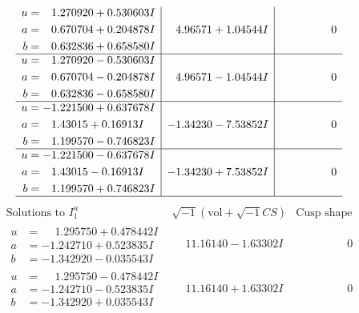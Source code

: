 \documentclass[1p]{elsarticle_modified}
\theoremstyle{definition}
\newcommand{\I}{\sqrt{-1}}
\begin{document}
$$\begin{array}{c|c|c}
\begin{aligned}
u &= \phantom{-}1.270920 + 0.530603 I \\
a &= \phantom{-}0.670704 + 0.204878 I \\
b &= \phantom{-}0.632836 + 0.658580 I\end{aligned}
 & \phantom{-}4.96571 + 1.04544 I & \phantom{-0.000000 } 0 \\ \hline\begin{aligned}
u &= \phantom{-}1.270920 - 0.530603 I \\
a &= \phantom{-}0.670704 - 0.204878 I \\
b &= \phantom{-}0.632836 - 0.658580 I\end{aligned}
 & \phantom{-}4.96571 - 1.04544 I & \phantom{-0.000000 } 0 \\ \hline\begin{aligned}
u &= -1.221500 + 0.637678 I \\
a &= \phantom{-}1.43015 + 0.16913 I \\
b &= \phantom{-}1.199570 - 0.746823 I\end{aligned}
 & -1.34230 - 7.53852 I & \phantom{-0.000000 } 0 \\ \hline\begin{aligned}
u &= -1.221500 - 0.637678 I \\
a &= \phantom{-}1.43015 - 0.16913 I \\
b &= \phantom{-}1.199570 + 0.746823 I\end{aligned}
 & -1.34230 + 7.53852 I & \phantom{-0.000000 } 0\\
 \hline 
 \end{array}$$\newpage$$\begin{array}{c|c|c}  
\text{Solutions to }I^u_{1}& \I (\text{vol} + \sqrt{-1}CS) & \text{Cusp shape}\\
 \hline 
\begin{aligned}
u &= \phantom{-}1.295750 + 0.478442 I \\
a &= -1.242710 + 0.523835 I \\
b &= -1.342920 - 0.035543 I\end{aligned}
 & \phantom{-}11.16140 - 1.63302 I & \phantom{-0.000000 } 0 \\ \hline\begin{aligned}
u &= \phantom{-}1.295750 - 0.478442 I \\
a &= -1.242710 - 0.523835 I \\
b &= -1.342920 + 0.035543 I\end{aligned}
 & \phantom{-}11.16140 + 1.63302 I & \phantom{-0.000000 } 0 \\ \hline\begin{aligned}

\end{aligned}
\end{array}$$
\end{document}
